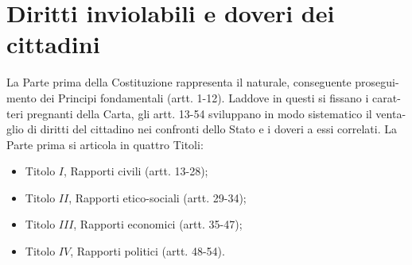 \documentclass{report}
\begin{document}
\section{Diritti inviolabili e doveri dei cittadini}

La Parte prima della Costituzione rappresenta il naturale, conseguente prosegui-
mento dei Principi fondamentali (artt. 1-12). Laddove in questi si fissano i carat-
teri pregnanti della Carta, gli artt. 13-54 sviluppano in modo sistematico il venta-
glio di diritti del cittadino nei confronti dello Stato e i doveri a essi correlati.
La Parte prima si articola in quattro Titoli:

\begin{itemize}
  \item Titolo $I$, Rapporti civili (artt. 13-28);
  \item Titolo $II$, Rapporti etico-sociali (artt. 29-34);
  \item Titolo $III$, Rapporti economici (artt. 35-47);
  \item Titolo $IV$, Rapporti politici (artt. 48-54).
\end{itemize}
\end{document}
